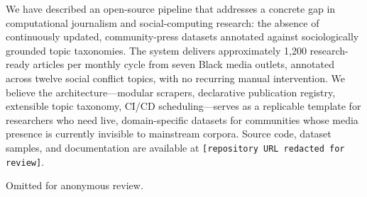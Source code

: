 \documentclass[sigconf,anonymous]{acmart}
\begin{document}
We have described an open-source pipeline that addresses a concrete gap in
computational journalism and social-computing research: the absence of
continuously updated, community-press datasets annotated against sociologically
grounded topic taxonomies.
The system delivers approximately 1,200 research-ready articles per monthly
cycle from seven Black media outlets, annotated across twelve social conflict
topics, with no recurring manual intervention.
We believe the architecture---modular scrapers, declarative publication registry,
extensible topic taxonomy, CI/CD scheduling---serves as a replicable template
for researchers who need live, domain-specific datasets for communities whose
media presence is currently invisible to mainstream corpora.
Source code, dataset samples, and documentation are available at
\texttt{[repository URL redacted for review]}.

\begin{acks}
Omitted for anonymous review.
\end{acks}
\end{document}
